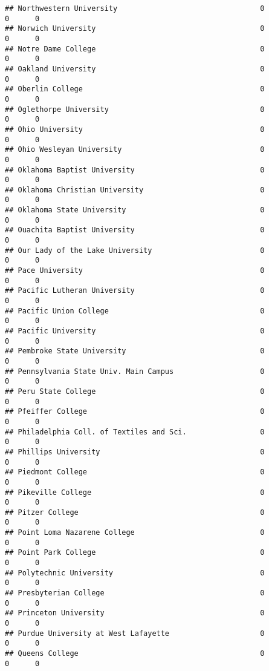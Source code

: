 \documentclass[
]{article}
\begin{document}
\begin{verbatim}
## Northwestern University                                 0          0      0
## Norwich University                                      0          0      0
## Notre Dame College                                      0          0      0
## Oakland University                                      0          0      0
## Oberlin College                                         0          0      0
## Oglethorpe University                                   0          0      0
## Ohio University                                         0          0      0
## Ohio Wesleyan University                                0          0      0
## Oklahoma Baptist University                             0          0      0
## Oklahoma Christian University                           0          0      0
## Oklahoma State University                               0          0      0
## Ouachita Baptist University                             0          0      0
## Our Lady of the Lake University                         0          0      0
## Pace University                                         0          0      0
## Pacific Lutheran University                             0          0      0
## Pacific Union College                                   0          0      0
## Pacific University                                      0          0      0
## Pembroke State University                               0          0      0
## Pennsylvania State Univ. Main Campus                    0          0      0
## Peru State College                                      0          0      0
## Pfeiffer College                                        0          0      0
## Philadelphia Coll. of Textiles and Sci.                 0          0      0
## Phillips University                                     0          0      0
## Piedmont College                                        0          0      0
## Pikeville College                                       0          0      0
## Pitzer College                                          0          0      0
## Point Loma Nazarene College                             0          0      0
## Point Park College                                      0          0      0
## Polytechnic University                                  0          0      0
## Presbyterian College                                    0          0      0
## Princeton University                                    0          0      0
## Purdue University at West Lafayette                     0          0      0
## Queens College                                          0          0      0

\end{verbatim}
\end{document}
